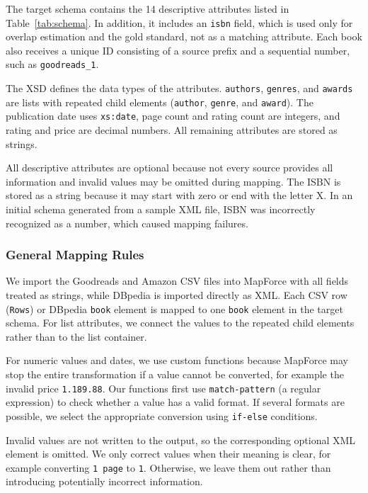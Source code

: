 \documentclass[runningheads]{llncs}
\begin{document}
The target schema contains the 14 descriptive attributes listed
in Table~\ref{tab:schema}. In addition, it includes an
\texttt{isbn} field, which is used only for overlap estimation
and the gold standard, not as a matching attribute. Each book
also receives a unique ID consisting of a source prefix and a
sequential number, such as \texttt{goodreads\_1}.

The XSD defines the data types of the attributes.
\texttt{authors}, \texttt{genres}, and \texttt{awards} are lists
with repeated child elements (\texttt{author}, \texttt{genre},
and \texttt{award}). The publication date uses
\texttt{xs:date}, page count and rating count are integers,
and rating and price are decimal numbers. All remaining
attributes are stored as strings.

All descriptive attributes are optional because not every
source provides all information and invalid values may be
omitted during mapping. The ISBN is stored as a string because
it may start with zero or end with the letter X. In an initial
schema generated from a sample XML file, ISBN was incorrectly
recognized as a number, which caused mapping failures.

\subsubsection{General Mapping Rules}

We import the Goodreads and Amazon CSV files into MapForce
with all fields treated as strings, while DBpedia is imported
directly as XML. Each CSV row (\texttt{Rows}) or DBpedia
\texttt{book} element is mapped to one \texttt{book} element
in the target schema. For list attributes, we connect the
values to the repeated child elements rather than to the
list container.

For numeric values and dates, we use custom functions because
MapForce may stop the entire transformation if a value cannot
be converted, for example the invalid price
\texttt{1.189.88}. Our functions first use
\texttt{match-pattern} (a regular expression) to check
whether a value has a valid format. If several formats are
possible, we select the appropriate conversion using
\texttt{if-else} conditions.

Invalid values are not written to the output, so the
corresponding optional XML element is omitted. We only correct
values when their meaning is clear, for example converting
\texttt{1 page} to \texttt{1}. Otherwise, we leave them out
rather than introducing potentially incorrect information.
\end{document}
